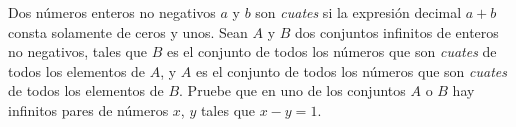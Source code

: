  Dos números enteros no negativos $a$ y $b$ son \emph{cuates} si la expresión decimal $a+b$ consta solamente de ceros y unos. Sean $A$ y $B$ dos conjuntos infinitos de enteros no negativos, tales que $B$ es el conjunto de todos los números que son \emph{cuates} de todos los elementos de $A$, y $A$ es el conjunto de todos los números que son \emph{cuates} de todos los elementos de $B$. Pruebe que en uno de los conjuntos $A$ o $B$ hay infinitos pares de números $x$, $y$ tales que $x-y =1$. 